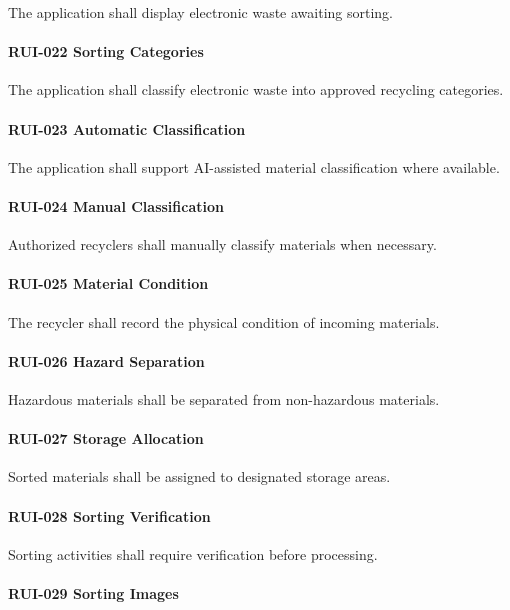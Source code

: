 The application shall display electronic waste awaiting sorting.

\paragraph{RUI-022 Sorting Categories}

The application shall classify electronic waste into approved recycling
categories.

\paragraph{RUI-023 Automatic Classification}

The application shall support AI-assisted material classification where
available.

\paragraph{RUI-024 Manual Classification}

Authorized recyclers shall manually classify materials when necessary.

\paragraph{RUI-025 Material Condition}

The recycler shall record the physical condition of incoming materials.

\paragraph{RUI-026 Hazard Separation}

Hazardous materials shall be separated from non-hazardous materials.

\paragraph{RUI-027 Storage Allocation}

Sorted materials shall be assigned to designated storage areas.

\paragraph{RUI-028 Sorting Verification}

Sorting activities shall require verification before processing.

\paragraph{RUI-029 Sorting Images}

